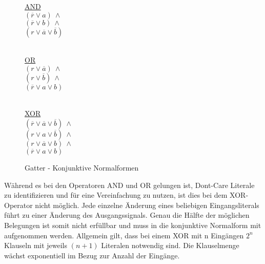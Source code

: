 \begin{figure}[!h]
  \centering
  \begin{minipage}[l]{4.65cm}
    \underline{AND}\\
    $ (\overline{r} \vee a) ~ \wedge $\\
    $ (\overline{r} \vee b) ~ \wedge $\\
    $ (r \vee \overline{a} \vee \overline{b}) $\\
    ~
  \end{minipage}
  \begin{minipage}[l]{4.65cm}
    \underline{OR}\\
    $ (r \vee \overline{a}) ~ \wedge $\\
    $ (r \vee \overline{b}) ~ \wedge $\\
    $ (\overline{r} \vee a \vee b) $\\
    ~
  \end{minipage}
  \begin{minipage}[l]{4.3cm}
    \underline{XOR}\\
    $ (\overline{r} \vee \overline{a} \vee \overline{b}) ~ \wedge $\\
    $ (r \vee a \vee \overline{b}) ~ \wedge $\\
    $ (r \vee \overline{a} \vee b) ~ \wedge $\\
    $ (\overline{r} \vee a \vee b) $
  \end{minipage}
  \caption{Gatter - Konjunktive Normalformen}
  \label{fig:gatter_cnf}
\end{figure}

Während es bei den Operatoren AND und OR gelungen ist, Dont-Care Literale zu identifizieren und für eine Vereinfachung zu nutzen, ist dies bei dem XOR-Operator
nicht möglich. Jede einzelne Änderung eines beliebigen Eingangsliterals führt zu einer Änderung des Ausgangssignals. Genau die Hälfte der möglichen Belegungen
ist somit nicht erfüllbar und muss in die konjunktive Normalform mit aufgenommen werden. Allgemein gilt, dass bei einem XOR mit n Eingängen $ 2^{n} $ Klauseln
mit jeweils $ (n + 1) $ Literalen notwendig sind. Die Klauselmenge wächst exponentiell im Bezug zur Anzahl der Eingänge.

